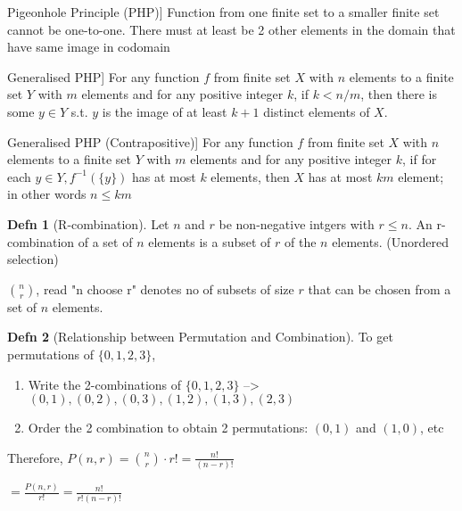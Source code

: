 \documentclass[a4paper]{article}
\theoremstyle{definition}
\newtheorem*{defn}{Defn}
\newenvironment{theorem}[1]
  {\renewcommand\theinnertheorem{#1}\innertheorem}
  {\endinnertheorem}
\begin{document}
\begin{theorem}[Pigeonhole Principle (PHP)] Function from one finite set to a smaller finite set cannot be one-to-one. There must at least be 2 other elements in the domain that have same image in codomain \end{theorem}

\begin{theorem}[Generalised PHP] For any function $f$ from finite set $X$ with $n$ elements to a finite set $Y$ with $m$ elements and for any positive integer $k$, if $k < n/m$, then there is some $y \in Y$ s.t. $y$ is the image of at least $k+1$ distinct elements of $X$. \end{theorem}

\begin{theorem}[Generalised PHP (Contrapositive)] For any function $f$ from finite set $X$ with $n$ elements to a finite set $Y$ with $m$ elements and for any positive integer $k$, if for each $y \in Y, f^{-1}(\{y\})$ has at most $k$ elements, then $X$ has at most $km$ element; in other words $n \leq km$ \end{theorem}

\begin{defn}[R-combination] Let $n$ and $r$ be non-negative intgers with $r \leq n$. An r-combination of a set of $n$ elements is a subset of $r$ of the $n$ elements. (Unordered selection)

  $n \choose r$, read "n choose r" denotes no of subsets of size $r$ that can be chosen from a set of $n$ elements.
\end{defn}

\begin{defn}[Relationship between Permutation and Combination] 
  To get permutations of $\{0,1,2,3\}$, 
  \begin{enumerate}
    \item Write the 2-combinations of $\{0, 1, 2, 3\}$ --> $(0,1), (0,2), (0,3),(1,2), (1,3),(2,3)$
    \item Order the 2 combination to obtain 2 permutations: $(0,1)$ and $(1,0)$, etc
  \end{enumerate}

  Therefore, $P(n,r) = {n \choose r} \cdot r! = \frac{n!}{(n-r)!}$
\end{defn}

\begin{theorem}{9.5.1}[Formula for $n \choose r$]
  $ = \frac{P(n, r)}{r!} = \frac{n!}{r!(n-r)!}$
\end{theorem}
\end{document}
